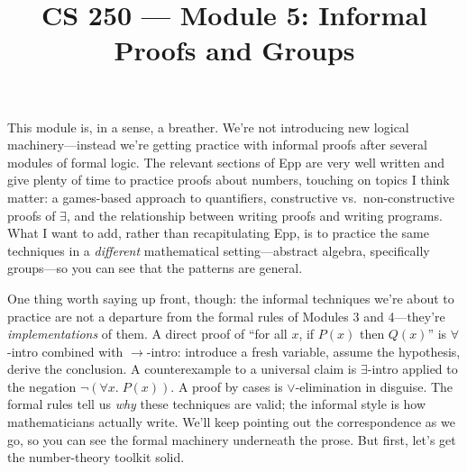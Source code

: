 \documentclass[11pt]{article}
\title{CS 250 --- Module 5: Informal Proofs and Groups}
\author{}
\date{}
\begin{document}
\maketitle

\begin{readingmap}




\end{readingmap}

This module is, in a sense, a breather. We're not introducing new logical machinery---instead we're getting practice with informal proofs after several modules of formal logic. The relevant sections of Epp are very well written and give plenty of time to practice proofs about numbers, touching on topics I think matter: a games-based approach to quantifiers, constructive vs.\ non-constructive proofs of $\exists$, and the relationship between writing proofs and writing programs. What I want to add, rather than recapitulating Epp, is to practice the same techniques in a \emph{different} mathematical setting---abstract algebra, specifically groups---so you can see that the patterns are general.

One thing worth saying up front, though: the informal techniques we're about to practice are not a departure from the formal rules of Modules 3 and 4---they're \emph{implementations} of them. A direct proof of ``for all $x$, if $P(x)$ then $Q(x)$'' is $\forall$-intro combined with $\to$-intro: introduce a fresh variable, assume the hypothesis, derive the conclusion. A counterexample to a universal claim is $\exists$-intro applied to the negation $\lnot(\forall x.\; P(x))$. A proof by cases is $\vee$-elimination in disguise. The formal rules tell us \emph{why} these techniques are valid; the informal style is how mathematicians actually write. We'll keep pointing out the correspondence as we go, so you can see the formal machinery underneath the prose. But first, let's get the number-theory toolkit solid.
\end{document}
